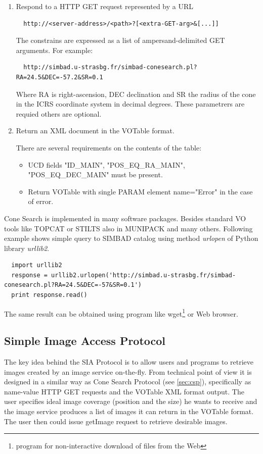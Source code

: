 \begin{enumerate}
\item Respond to a HTTP GET request represented by a URL 

\begin{lstlisting}
  http://<server-address>/<path>?[<extra-GET-arg>&[...]]
\end{lstlisting}

The constrains are expressed as a list of ampersand-delimited GET
arguments. For example:

\begin{lstlisting}
  http://simbad.u-strasbg.fr/simbad-conesearch.pl?RA=24.5&DEC=-57.2&SR=0.1
\end{lstlisting}

Where RA is right-ascension, DEC declination and SR the radius of the
cone in the ICRS coordinate system in decimal degrees. These
parametrers are requied others are optional.

\item Return an XML document in the VOTable format.  

  There are several requirements on the contents of the table:

  \begin{itemize}
  \item UCD fields "ID\_MAIN", "POS\_EQ\_RA\_MAIN", "POS\_EQ\_DEC\_MAIN" must
    be present.
  \item Return VOTable with single PARAM element name="Error" in the
    case of error.
  \end{itemize}

\end{enumerate}

Cone Search is implemented in many software packages. Besides standard
VO tools like TOPCAT or STILTS also in MUNIPACK and many others.
Following example shows simple query to SIMBAD \cite{wenger2000simbad}
catalog using method \emph{urlopen} of Python library \emph{urllib2}.
 
\begin{lstlisting}
  import urllib2
  response = urllib2.urlopen('http://simbad.u-strasbg.fr/simbad-conesearch.pl?RA=24.5&DEC=-57&SR=0.1')
  print response.read()
\end{lstlisting}

\noindent The same result can be obtained using program like wget\footnote{program
  for non-interactive download of files from the Web} or Web browser.

\subsection{Simple Image Access Protocol}
The key idea behind the SIA Protocol is to allow users and programs to
retrieve images created by an image service on-the-fly. From technical
point of view it is designed in a similar way as Cone Search Protocol
(see \ref{sec:csp}), specifically as name-value HTTP GET requests and
the VOTable XML format output. The user specifies ideal image coverage
(position and the size) he wants to receive and the image service
produces a list of images it can return in the VOTable format. The
user then could issue getImage request to retrieve desirable images.

